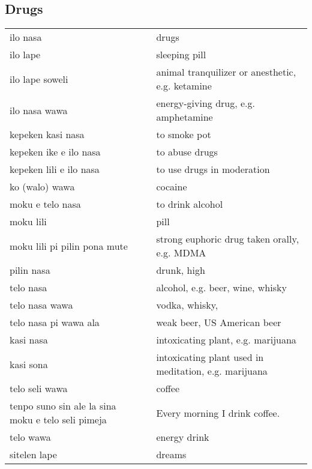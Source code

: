\subsection{Drugs}
%
\begin{supertabular}{p{4,5cm}|ll}
ilo nasa && drugs \\
ilo lape && sleeping pill \\
ilo lape soweli && animal tranquilizer or anesthetic, e.g. ketamine \\
ilo nasa wawa && energy-giving drug, e.g. amphetamine \\
kepeken kasi nasa && to smoke pot \\
kepeken ike e ilo nasa && to abuse drugs \\ 
kepeken lili e ilo nasa && to use drugs in moderation \\
ko (walo) wawa && cocaine \\
moku e telo nasa && to drink alcohol \\
moku lili && pill \\
moku lili pi pilin pona mute && strong euphoric drug taken orally, e.g. MDMA \\
pilin nasa && drunk, high \\
telo nasa && alcohol, e.g. beer, wine, whisky \\
telo nasa wawa && vodka, whisky, \\
telo nasa pi wawa ala && weak beer, US American beer \\
kasi nasa && intoxicating plant, e.g. marijuana \\
kasi sona && intoxicating plant used in meditation, e.g. marijuana \\
telo seli wawa && coffee \\ 
tenpo suno sin ale la sina moku e telo seli pimeja && Every morning I drink coffee. \\
telo wawa && energy drink \\ 
sitelen lape && dreams \\
\end{supertabular} \\
%
%
